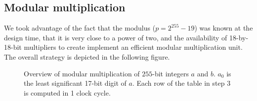 \subsection{Modular multiplication}\label{modular-multiplication}

We took advantage of the fact that the modulus (\(p=2^{255}-19\)) was
known at the design time, that it is very close to a power of two, and
the availability of 18-by-18-bit multipliers to create implement an
efficient modular multiplication unit. The overall strategy is depicted
in the following figure.

\begin{figure}
\label{figFemul}
%
\centering \caption{Overview of modular multiplication of $255$-bit integers $a$
and $b$. $a_0$ is the least significant 17-bit digit of $a$. Each row of the
table in step 3 is computed in 1 clock cycle.}
\end{figure}

